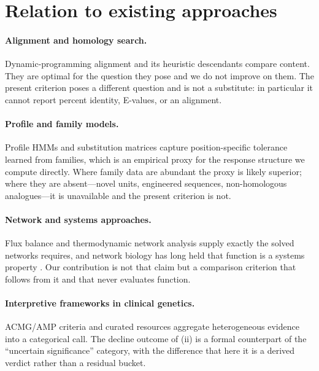 \documentclass[11pt,twocolumn,a4paper]{article}
\theoremstyle{definition}
\theoremstyle{remark}
\begin{document}
\section{Relation to existing approaches}
\label{sec:related}

\paragraph{Alignment and homology search.} Dynamic-programming alignment
\citep{needleman1970,smith1981} and its heuristic descendants
\citep{altschul1990,altschul1997} compare content. They are optimal for
the question they pose and we do not improve on them. The present
criterion poses a different question and is not a substitute: in
particular it cannot report percent identity, E-values, or an alignment.

\paragraph{Profile and family models.} Profile HMMs \citep{eddy1998} and
substitution matrices \citep{henikoff1992} capture position-specific
tolerance learned from families, which is an empirical proxy for the
response structure we compute directly. Where family data are abundant the
proxy is likely superior; where they are absent---novel units, engineered
sequences, non-homologous analogues---it is unavailable and the present
criterion is not.

\paragraph{Network and systems approaches.} Flux balance and thermodynamic
network analysis \citep{orth2010,beard2002,qian2005} supply exactly the
solved networks  requires, and network biology has long
held that function is a systems property \citep{barabasi2004}. Our
contribution is not that claim but a comparison criterion that follows
from it and that never evaluates function.

\paragraph{Interpretive frameworks in clinical genetics.} ACMG/AMP
criteria \citep{richards2015} and curated resources
\citep{landrum2018,rehm2015} aggregate heterogeneous evidence into a
categorical call. The decline outcome of (ii) is a
formal counterpart of the ``uncertain significance'' category, with the
difference that here it is a derived verdict rather than a residual bucket.
\end{document}

